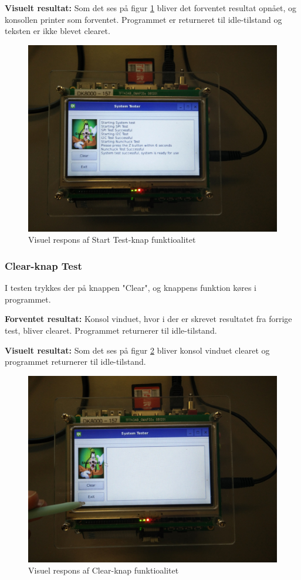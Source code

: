 \noindent\textbf{Visuelt resultat:}\newline
Som det ses på figur \ref{fig:GUIPrint} bliver det forventet resultat opnået, og konsollen printer som forventet.
Programmet er returneret til idle-tilstand og teksten er ikke blevet clearet. 

\begin{figure}[H]
	\centering
	\includegraphics[width=.5\textwidth]{Test/images/GUITest/TestPrint.jpg}
	\caption{Visuel respons af Start Test-knap funktioalitet}
	\label{fig:GUIPrint}
\end{figure}

\subsubsection{Clear-knap Test}
I testen trykkes der på knappen "Clear", og knappens funktion køres i programmet.\newline

\noindent\textbf{Forventet resultat:}\newline
Konsol vinduet, hvor i der er skrevet resultatet fra forrige test, bliver clearet. Programmet returnerer til idle-tilstand.\newline

\noindent\textbf{Visuelt resultat:}\newline
\noindent Som det ses på figur \ref{fig:GUIClear} bliver konsol vinduet clearet og programmet returnerer til idle-tilstand.\newline

\begin{figure}[H]
	\centering
	\includegraphics[width=.5\textwidth]{Test/images/GUITest/TestClear.jpg}
	\caption{Visuel respons af Clear-knap funktioalitet}
	\label{fig:GUIClear}
\end{figure}

